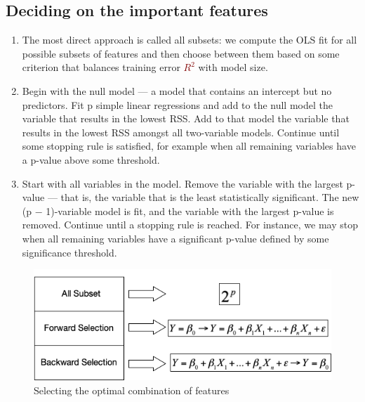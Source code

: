 \documentclass{tufte-handout}
\newcommand{\hlred}[1]{\textcolor{Maroon}{#1}}%
\begin{document}
\subsection{Deciding on the important features}

\begin{enumerate}
    \item \newthought{\hlred{All Subset Approach}}
    The most direct approach is called all subsets: we compute the OLS fit for all possible subsets of features and then choose between them based on some criterion that balances training error \hlred{\(R^2\)} with model size. 
    \item \newthought{\hlred{Forward Selection}}
    Begin with the null model — a model that contains an
intercept but no predictors. Fit p simple linear regressions and add to the null model
the variable that results in the lowest RSS. Add to that model the variable that results in the lowest
RSS amongst all two-variable models. Continue until some stopping rule is satisfied, for example
when all remaining variables have a p-value above some
threshold.
    
    \item \newthought{\hlred{Backward selection}}
    Start with all variables in the model. Remove the variable with the largest p-value — that is, the
variable that is the least statistically significant. The new (p − 1)-variable model is fit, and the variable with the largest p-value is removed. Continue until a stopping rule is reached. For instance, we may stop when all remaining variables have a significant p-value defined by some significance threshold.
    
\end{enumerate}

 \begin{figure}
  \includegraphics{multiple.png}
  \caption{Selecting the optimal combination of features}
  \label{fig:textfig}
\end{figure}
\end{document}
